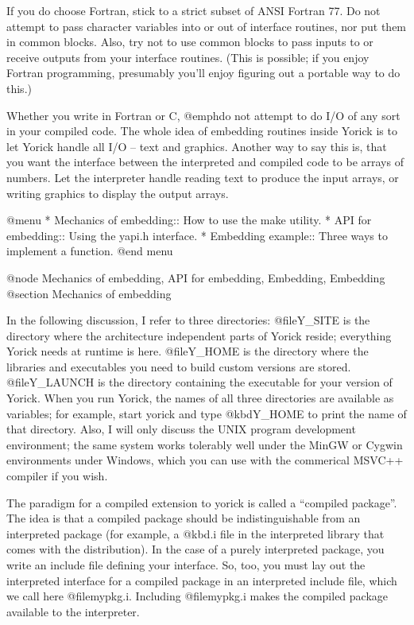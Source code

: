 If you do choose Fortran, stick to a strict subset of ANSI Fortran 77.
Do not attempt to pass character variables into or out of interface
routines, nor put them in common blocks.  Also, try not to use common
blocks to pass inputs to or receive outputs from your interface
routines.  (This is possible; if you enjoy Fortran programming,
presumably you'll enjoy figuring out a portable way to do this.)

Whether you write in Fortran or C, @emph{do not} attempt to do I/O of
any sort in your compiled code.  The whole idea of embedding routines
inside Yorick is to let Yorick handle all I/O -- text and graphics.
Another way to say this is, that you want the interface between the
interpreted and compiled code to be arrays of numbers.  Let the
interpreter handle reading text to produce the input arrays, or
writing graphics to display the output arrays.

@menu
* Mechanics of embedding::      How to use the make utility.
* API for embedding::           Using the yapi.h interface.
* Embedding example::           Three ways to implement a function.
@end menu

@node Mechanics of embedding, API for embedding, Embedding, Embedding
@section Mechanics of embedding

In the following discussion, I refer to three directories:
@file{Y_SITE} is the directory where the architecture independent
parts of Yorick reside; everything Yorick needs at runtime is here.
@file{Y_HOME} is the directory where the libraries and executables you
need to build custom versions are stored.  @file{Y_LAUNCH} is the
directory containing the executable for your version of Yorick.  When
you run Yorick, the names of all three directories are available as
variables; for example, start yorick and type @kbd{Y_HOME} to print
the name of that directory.  Also, I will only discuss the UNIX
program development environment; the same system works tolerably well
under the MinGW or Cygwin environments under Windows, which you can
use with the commerical MSVC++ compiler if you wish.

The paradigm for a compiled extension to yorick is called a ``compiled
package''.  The idea is that a compiled package should be
indistinguishable from an interpreted package (for example, a @kbd{.i}
file in the interpreted library that comes with the distribution).  In
the case of a purely interpreted package, you write an include file
defining your interface.  So, too, you must lay out the interpreted
interface for a compiled package in an interpreted include file, which
we call here @file{mypkg.i}.  Including @file{mypkg.i} makes the
compiled package available to the interpreter.

